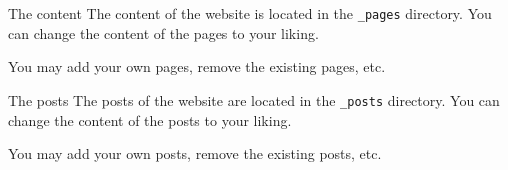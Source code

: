 \documentclass{beamer}
\begin{document}
\begin{frame}{The content}
    The content of the website is located in the \texttt{\_pages} directory. You can change the content of the pages to your liking.

    You may add your own pages, remove the existing pages, etc.
\end{frame}

\begin{frame}{The posts}
    The posts of the website are located in the \texttt{\_posts} directory. You can change the content of the posts to your liking.

    You may add your own posts, remove the existing posts, etc.
\end{frame}
\end{document}
